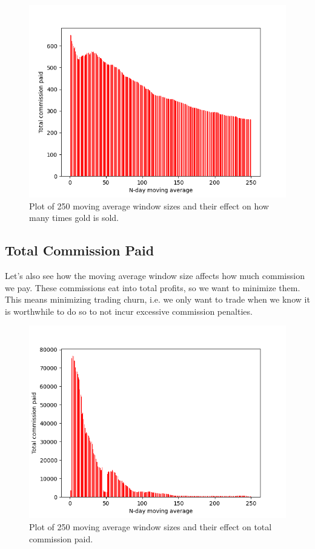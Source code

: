 \documentclass[12pt]{article}
\begin{document}
\begin{figure}[h!]
    \includegraphics[totalheight=8cm]{figures/gold_sales.png}
    \centering
    \caption{Plot of 250 moving average window sizes and their effect on how many times gold is sold.}
    \label{gold_sales}
\end{figure}

\subsection{Total Commission Paid}
Let's also see how the moving average window size affects how much commission we pay. These commissions eat into total profits, so we want to minimize them. This means minimizing
trading churn, i.e. we only want to trade when we know it is worthwhile to do so to not incur excessive commission penalties.

\begin{figure}[h!]
    \includegraphics[totalheight=8cm]{figures/comissions.png}
    \centering
    \caption{Plot of 250 moving average window sizes and their effect on total commission paid.}
    \label{commission}
\end{figure}
\end{document}
